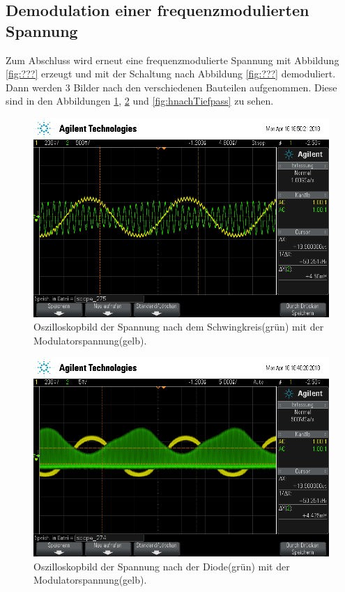 \subsection{Demodulation einer frequenzmodulierten Spannung}

Zum Abschluss wird erneut eine frequenzmodulierte Spannung mit Abbildung \ref{fig:???} erzeugt und mit der Schaltung nach Abbildung \ref{fig:???} demoduliert. Dann werden 3 Bilder nach den verschiedenen Bauteilen aufgenommen.
Diese sind in den Abbildungen \ref{fig:hnachSchwingkreis}, \ref{fig:hnachDiode} und \ref{fig:hnachTiefpass} zu sehen.
\begin{figure}[h]
  \centering
  \includegraphics[width=.9\textwidth]{Oszi_Pics/hnachSchwingkreis.png}
  \caption{Oszilloskopbild der Spannung nach dem Schwingkreis(grün) mit der Modulatorspannung(gelb).}
  \label{fig:hnachSchwingkreis}
\end{figure}
\begin{figure}[h]
  \centering
  \includegraphics[width=.9\textwidth]{Oszi_Pics/hnachDiode?.png}
  \caption{Oszilloskopbild der Spannung nach der Diode(grün) mit der Modulatorspannung(gelb).}
  \label{fig:hnachDiode}
\end{figure}
